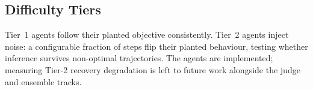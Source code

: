 \subsection{Difficulty Tiers}
Tier~1 agents follow their planted objective consistently. Tier~2 agents inject
noise: a configurable fraction of steps flip their planted behaviour, testing
whether inference survives non-optimal trajectories. The agents are implemented;
measuring Tier-2 recovery degradation is left to future work alongside the
judge and ensemble tracks.
